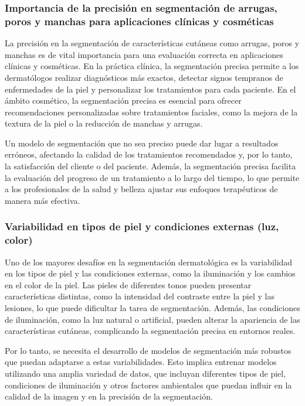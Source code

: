 \cite{sorensen1948}

\subsubsection{Importancia de la precisión en segmentación de arrugas, poros y manchas para aplicaciones clínicas y cosméticas}
La precisión en la segmentación de características cutáneas como arrugas, poros y manchas es de vital importancia para una evaluación correcta en aplicaciones clínicas y cosméticas. En la práctica clínica, la segmentación precisa permite a los dermatólogos realizar diagnósticos más exactos, detectar signos tempranos de enfermedades de la piel y personalizar los tratamientos para cada paciente. En el ámbito cosmético, la segmentación precisa es esencial para ofrecer recomendaciones personalizadas sobre tratamientos faciales, como la mejora de la textura de la piel o la reducción de manchas y arrugas.

Un modelo de segmentación que no sea preciso puede dar lugar a resultados erróneos, afectando la calidad de los tratamientos recomendados y, por lo tanto, la satisfacción del cliente o del paciente. Además, la segmentación precisa facilita la evaluación del progreso de un tratamiento a lo largo del tiempo, lo que permite a los profesionales de la salud y belleza ajustar sus enfoques terapéuticos de manera más efectiva.
 
\cite{chuchu2020}

\subsubsection{Variabilidad en tipos de piel y condiciones externas (luz, color)}
Uno de los mayores desafíos en la segmentación dermatológica es la variabilidad en los tipos de piel y las condiciones externas, como la iluminación y los cambios en el color de la piel. Las pieles de diferentes tonos pueden presentar características distintas, como la intensidad del contraste entre la piel y las lesiones, lo que puede dificultar la tarea de segmentación. Además, las condiciones de iluminación, como la luz natural o artificial, pueden alterar la apariencia de las características cutáneas, complicando la segmentación precisa en entornos reales.

Por lo tanto, se necesita el desarrollo de modelos de segmentación más robustos que puedan adaptarse a estas variabilidades. Esto implica entrenar modelos utilizando una amplia variedad de datos, que incluyan diferentes tipos de piel, condiciones de iluminación y otros factores ambientales que puedan influir en la calidad de la imagen y en la precisión de la segmentación.

